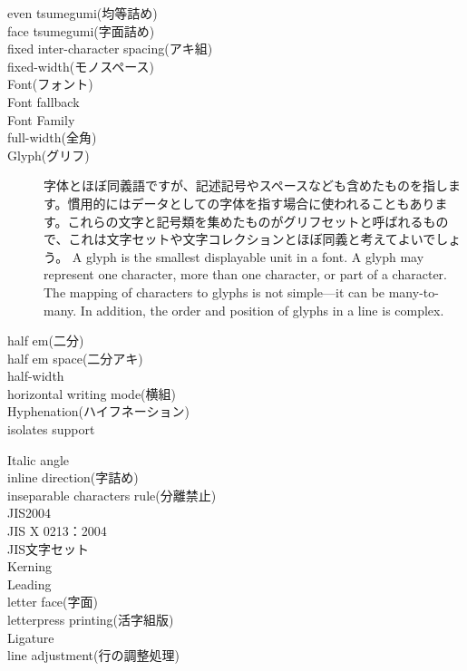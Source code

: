 \begin{description}
    \item[even tsumegumi(均等詰め)]
    \item[face tsumegumi(字面詰め)]
    \item[fixed inter-character spacing(アキ組)]
    \item[fixed-width(モノスペース)]
    \item[Font(フォント)]
    \item[Font fallback]
    \item[Font Family]
    \item[full-width(全角)]
    \item[Glyph(グリフ)]字体とほぼ同義語ですが、記述記号やスペースなども含めたものを指します。慣用的にはデータとしての字体を指す場合に使われることもあります。これらの文字と記号類を集めたものがグリフセットと呼ばれるもので、これは文字セットや文字コレクションとほぼ同義と考えてよいでしょう。 A glyph is the smallest displayable unit in a font. A glyph may represent one character, more than one character, or part of a character. The mapping of characters to glyphs is not simple—it can be many-to-many. In addition, the order and position of glyphs in a line is complex\cite{developer.apple.com:library/archive/documentation/MacOSX/Conceptual/BPInternational/InternationalizingYourCode/InternationalizingYourCode.html}.
    \item[half em(二分)]
    \item[half em space(二分アキ)]
    \item[half-width]
    \item[horizontal writing mode(横組)]
    \item[Hyphenation(ハイフネーション)]
    \item[isolates support]\cite{developer.apple.com:videos/play/wwdc2016/232/}
    \item[Italic angle]
    \item[inline direction(字詰め)]
    \item[inseparable characters rule(分離禁止)]
    \item[JIS2004]
    \item[JIS X 0213：2004]
    \item[JIS文字セット]
    \item[Kerning]
    \item[Leading]
    \item[letter face(字面)]
    \item[letterpress printing(活字組版)]
    \item[Ligature]
    \item[line adjustment(行の調整処理)]

\end{description}
